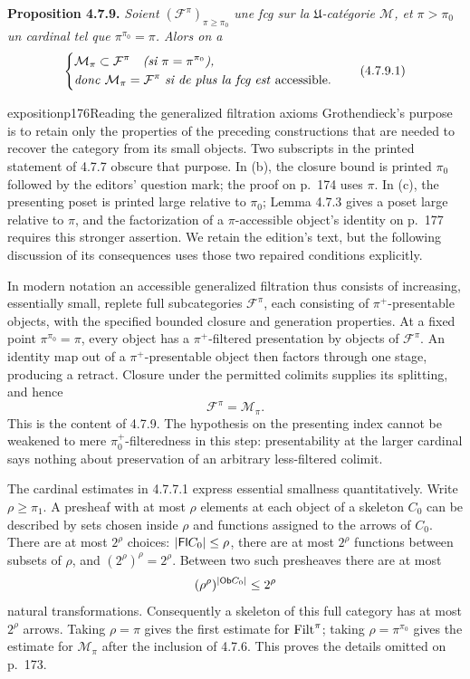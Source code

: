 \textbf{Proposition 4.7.9.} \textit{Soient $(\mathcal{F}^{\pi})_{\pi\geqslant\pi_0}$ une fcg sur la $\mathfrak{U}$-catégorie $\mathcal{M}$, et $\pi>\pi_0$ un cardinal tel que $\pi^{\pi_0}=\pi$. Alors on a}
\[
\left\{
\begin{aligned}
&\mathcal{M}_\pi\subset\mathcal{F}^{\pi}\quad\text{\textit{(si $\pi=\pi^{\pi_0}$),}}\\
&\text{\textit{donc} }\mathcal{M}_\pi=\mathcal{F}^{\pi}\text{ \textit{si de plus la fcg est} accessible.}
\end{aligned}
\right.
\tag*{(4.7.9.1)}
\]

\begin{dcomment}{exposition}{p176}{Reading the generalized filtration axioms}
Grothendieck's purpose is to retain only the properties of the preceding constructions that are needed to recover the category from its small objects. Two subscripts in the printed statement of 4.7.7 obscure that purpose. In (b), the closure bound is printed $\pi_0$ followed by the editors' question mark; the proof on p.~174 uses $\pi$. In (c), the presenting poset is printed large relative to $\pi_0$; Lemma 4.7.3 gives a poset large relative to $\pi$, and the factorization of a $\pi$-accessible object's identity on p.~177 requires this stronger assertion. We retain the edition's text, but the following discussion of its consequences uses those two repaired conditions explicitly.

In modern notation an accessible generalized filtration thus consists of increasing, essentially small, replete full subcategories $\mathcal F^\pi$, each consisting of $\pi^+$-presentable objects, with the specified bounded closure and generation properties. At a fixed point $\pi^{\pi_0}=\pi$, every object has a $\pi^+$-filtered presentation by objects of $\mathcal F^\pi$. An identity map out of a $\pi^+$-presentable object then factors through one stage, producing a retract. Closure under the permitted colimits supplies its splitting, and hence
\[
 \mathcal F^\pi=\mathcal M_\pi.
\]
This is the content of 4.7.9. The hypothesis on the presenting index cannot be weakened to mere $\pi_0^+$-filteredness in this step: presentability at the larger cardinal says nothing about preservation of an arbitrary less-filtered colimit.

The cardinal estimates in 4.7.7.1 express essential smallness quantitatively. Write $\rho\geq\pi_1$. A presheaf with at most $\rho$ elements at each object of a skeleton $C_0$ can be described by sets chosen inside $\rho$ and functions assigned to the arrows of $C_0$. There are at most $2^\rho$ choices: $|\mathsf{Fl} C_0|\leq\rho$, there are at most $2^\rho$ functions between subsets of $\rho$, and $(2^\rho)^\rho=2^\rho$. Between two such presheaves there are at most
\[
 (\rho^\rho)^{|\mathsf{Ob} C_0|}\leq 2^\rho
\]
natural transformations. Consequently a skeleton of this full category has at most $2^\rho$ arrows. Taking $\rho=\pi$ gives the first estimate for $\mathrm{Filt}^\pi$; taking $\rho=\pi^{\pi_0}$ gives the estimate for $\mathcal M_\pi$ after the inclusion of 4.7.6. This proves the details omitted on p.~173.


\end{dcomment}
